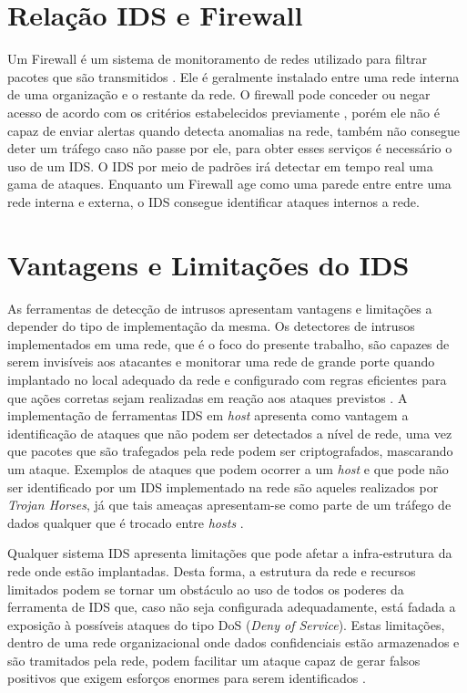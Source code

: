 	\section{Relação IDS e Firewall}
	\label{sec:IDS_Firewall}

	Um Firewall é um sistema de monitoramento de redes utilizado para filtrar pacotes que são transmitidos . Ele é geralmente instalado entre uma rede interna de uma organização e o restante da rede. O firewall pode conceder ou negar acesso de acordo com os critérios estabelecidos previamente \cite{Morais}, porém ele não é capaz de enviar alertas quando detecta anomalias na rede, também não consegue deter um tráfego caso não passe por ele, para obter esses serviços é necessário o uso de um IDS. O IDS por meio de padrões irá detectar em tempo real uma gama de ataques. Enquanto um Firewall age como uma parede entre entre uma rede interna e externa, o IDS consegue identificar ataques internos a rede.

	\section{Vantagens e Limitações do IDS}
	\label{sec:IDS_VeL}

	As ferramentas de detecção de intrusos apresentam vantagens e limitações a depender do tipo de implementação da mesma. Os detectores de intrusos implementados em uma rede, que é o foco do presente trabalho, são capazes de serem invisíveis aos atacantes e monitorar uma rede de grande porte quando implantado no local adequado da rede e configurado com regras eficientes para que ações corretas sejam realizadas em reação aos ataques previstos \cite{Comunidade Snort Brasil}.
	A implementação de ferramentas IDS em \textit{host} apresenta como vantagem a identificação de ataques que não podem ser detectados a nível de rede, uma vez que pacotes que são trafegados pela rede podem ser criptografados, mascarando um ataque. Exemplos de ataques que podem ocorrer a um \textit{host} e que pode não ser identificado por um IDS implementado na rede são aqueles realizados por \textit{Trojan Horses}, já que tais ameaças apresentam-se como parte de um tráfego de dados qualquer que é trocado entre \textit{hosts} \cite{Comunidade Snort Brasil}.
		
	Qualquer sistema IDS apresenta limitações que pode afetar a infra-estrutura da rede onde estão implantadas. Desta forma, a estrutura da rede e recursos limitados podem se tornar um obstáculo ao uso de todos os poderes da ferramenta de IDS que, caso não seja configurada adequadamente, está fadada a exposição à possíveis ataques do tipo DoS (\textit{Deny of Service}). Estas limitações, dentro de uma rede organizacional onde dados confidenciais estão armazenados e são tramitados pela rede, podem facilitar um ataque capaz de gerar falsos positivos que exigem esforços enormes para serem identificados \cite{Morais}.

